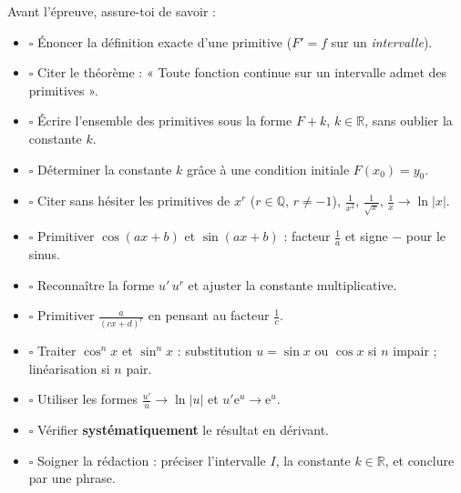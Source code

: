 \documentclass[11pt]{article}
\begin{document}
\begin{aretenir}
Avant l'épreuve, assure-toi de savoir :
\begin{itemize}
  \item $\square$ Énoncer la définition exacte d'une primitive ($F'=f$ sur un \emph{intervalle}).
  \item $\square$ Citer le théorème : « Toute fonction continue sur un intervalle admet des primitives ».
  \item $\square$ Écrire l'ensemble des primitives sous la forme $F+k$, $k\in\mathbb{R}$, sans oublier la constante $k$.
  \item $\square$ Déterminer la constante $k$ grâce à une condition initiale $F(x_0)=y_0$.
  \item $\square$ Citer sans hésiter les primitives de $x^r$ ($r\in\mathbb{Q}$, $r\neq -1$), $\frac{1}{x^2}$, $\frac{1}{\sqrt{x}}$, $\frac{1}{x}\to\ln|x|$.
  \item $\square$ Primitiver $\cos(ax+b)$ et $\sin(ax+b)$ : facteur $\frac{1}{a}$ et signe $-$ pour le sinus.
  \item $\square$ Reconnaître la forme $u'\,u^r$ et ajuster la constante multiplicative.
  \item $\square$ Primitiver $\frac{a}{(cx+d)^r}$ en pensant au facteur $\frac{1}{c}$.
  \item $\square$ Traiter $\cos^n x$ et $\sin^n x$ : substitution $u=\sin x$ ou $\cos x$ si $n$ impair ; linéarisation si $n$ pair.
  \item $\square$ Utiliser les formes $\frac{u'}{u}\to\ln|u|$ et $u'\mathrm{e}^u\to\mathrm{e}^u$.
  \item $\square$ Vérifier \textbf{systématiquement} le résultat en dérivant.
  \item $\square$ Soigner la rédaction : préciser l'intervalle $I$, la constante $k\in\mathbb{R}$, et conclure par une phrase.
\end{itemize}
\end{aretenir}
\end{document}
